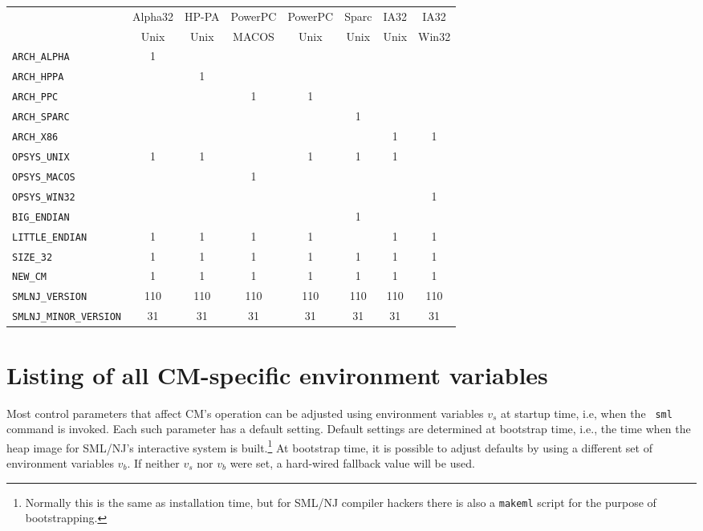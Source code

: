 \documentclass[titlepage,letterpaper]{article}
\newcommand{\smlmj}{110}
\newcommand{\smlmn}{31}
\begin{document}
\begin{center}
\begin{tabular}{l||c|c|c|c|c|c|c}
   & Alpha32 & HP-PA & PowerPC & PowerPC & Sparc & IA32 & IA32 \\
   & Unix & Unix & MACOS & Unix & Unix & Unix & Win32 \\
\hline \hline
{\tt ARCH\_ALPHA}    & 1 & & & & & & \\
{\tt ARCH\_HPPA}     & & 1 & & & & & \\
{\tt ARCH\_PPC}      & & & 1 & 1 & & & \\
{\tt ARCH\_SPARC}    & & & & & 1 & & \\
{\tt ARCH\_X86}      & & & & & & 1 & 1 \\
{\tt OPSYS\_UNIX}    & 1 & 1 & & 1 & 1 & 1 & \\
{\tt OPSYS\_MACOS}   & & & 1 & & & & \\
{\tt OPSYS\_WIN32}   & & & & & & & 1 \\
{\tt BIG\_ENDIAN}    & & & & & 1 & & \\
{\tt LITTLE\_ENDIAN} & 1 & 1 & 1 & 1 & & 1 & 1 \\
{\tt SIZE\_32}       & 1 & 1 & 1 & 1 & 1 & 1 & 1 \\
{\tt NEW\_CM}        & 1 & 1 & 1 & 1 & 1 & 1 & 1 \\
{\tt SMLNJ\_VERSION} & \smlmj & \smlmj & \smlmj & \smlmj & \smlmj & \smlmj & \smlmj \\
{\tt SMLNJ\_MINOR\_VERSION} & \smlmn & \smlmn & \smlmn & \smlmn & \smlmn & \smlmn & \smlmn
\end{tabular}
\end{center}

\section{Listing of all CM-specific environment variables}

Most control parameters that affect CM's operation can be adjusted
using environment variables $v_s$ at startup time, i.e, when the {\tt
sml} command is invoked.  Each such parameter has a default setting.
Default settings are determined at bootstrap time, i.e., the time when
the heap image for SML/NJ's interactive system is
built.\footnote{Normally this is the same as installation time, but
for SML/NJ compiler hackers there is also a {\tt makeml} script for the
purpose of bootstrapping.}  At bootstrap time, it is possible to
adjust defaults by using a different set of environment variables
$v_b$.  If neither $v_s$ nor $v_b$ were set, a hard-wired fallback
value will be used.
\end{document}
